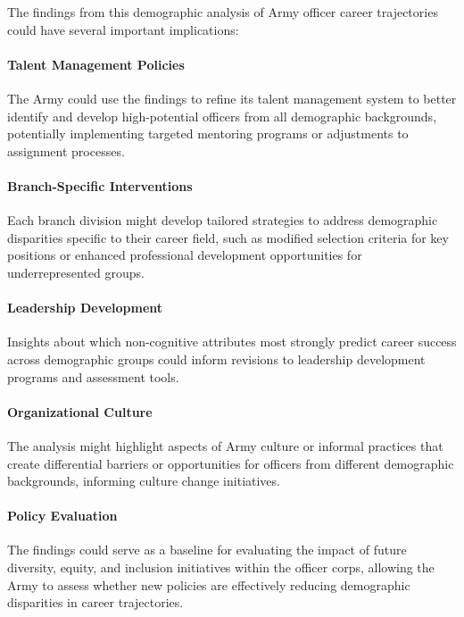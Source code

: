 \documentclass[../main.tex]{subfiles}
\begin{document}

The findings from this demographic analysis of Army officer career trajectories could have several important implications:

\paragraph{Talent Management Policies} The Army could use the findings to refine its talent management system to better identify and develop high-potential officers from all demographic backgrounds, potentially implementing targeted mentoring programs or adjustments to assignment processes.

\paragraph{Branch-Specific Interventions} Each branch division might develop tailored strategies to address demographic disparities specific to their career field, such as modified selection criteria for key positions or enhanced professional development opportunities for underrepresented groups.

\paragraph{Leadership Development} Insights about which non-cognitive attributes most strongly predict career success across demographic groups could inform revisions to leadership development programs and assessment tools.

\paragraph{Organizational Culture} The analysis might highlight aspects of Army culture or informal practices that create differential barriers or opportunities for officers from different demographic backgrounds, informing culture change initiatives.

\paragraph{Policy Evaluation} The findings could serve as a baseline for evaluating the impact of future diversity, equity, and inclusion initiatives within the officer corps, allowing the Army to assess whether new policies are effectively reducing demographic disparities in career trajectories.
\end{document}
